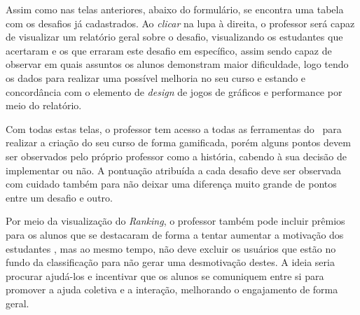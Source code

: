 
Assim como nas telas anteriores, abaixo do formulário, se encontra uma tabela com os desafios já cadastrados. Ao \textit{clicar} na lupa à direita, o professor será capaz de visualizar um relatório geral sobre o desafio, visualizando os estudantes que acertaram e os que erraram este desafio em específico, assim sendo capaz de observar em quais assuntos os alunos demonstram maior dificuldade, logo tendo os dados para realizar uma possível melhoria no seu curso e estando e concordância com o elemento de \textit{design} de jogos de gráficos e performance por meio do relatório.


Com todas estas telas, o professor tem acesso a todas as ferramentas do \appName\ para realizar a criação do seu curso de forma gamificada, porém alguns pontos devem ser observados pelo próprio professor como a história, cabendo à sua decisão de implementar ou não. A pontuação atribuída a cada desafio deve ser observada com cuidado também para não deixar uma diferença muito grande de pontos entre um desafio e outro. 

Por meio da visualização do \textit{Ranking}, o professor também pode incluir prêmios para os alunos que se destacaram de forma a tentar aumentar a motivação dos estudantes \cite{ranking_motivation}, mas ao mesmo tempo, não deve excluir os usuários que estão no fundo da classificação para não gerar uma desmotivação destes. A ideia seria procurar ajudá-los e incentivar que os alunos se comuniquem entre si para promover a ajuda coletiva e a interação, melhorando o engajamento de forma geral.
